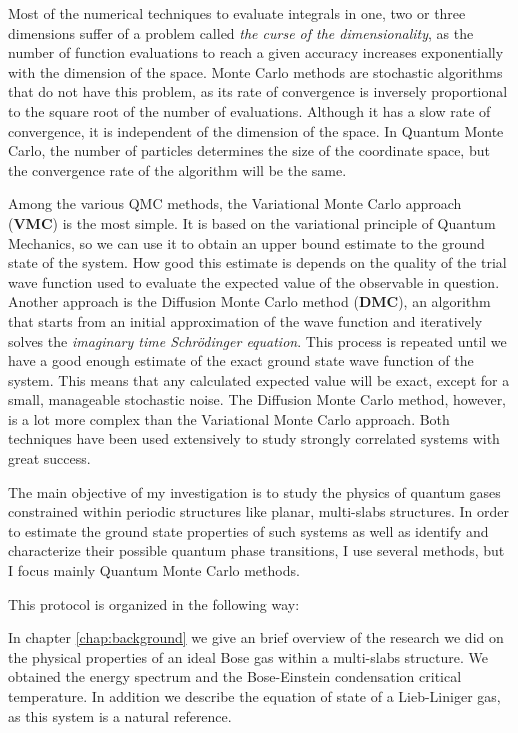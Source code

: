 Most of the numerical techniques to evaluate integrals in one, two or three
dimensions suffer of a problem called \textit{the curse of the dimensionality},
as the number of function evaluations to reach a given accuracy increases
exponentially with the dimension of the space. Monte Carlo methods are
stochastic algorithms that do not have this problem, as its rate of convergence
is inversely proportional to the square root of the number of evaluations.
Although it has a slow rate of convergence, it is independent of the dimension
of the space. In Quantum Monte Carlo, the number of particles determines the
size of the coordinate space, but the convergence rate of the algorithm will be
the same.

Among the various QMC methods, the Variational Monte Carlo approach
({\textbf{VMC}}) is the most simple. It is based on the variational principle of
Quantum Mechanics, so we can use it to obtain an upper bound estimate to the
ground state of the system. How good this estimate is depends on the quality of
the trial wave function used to evaluate the expected value of the observable in
question. Another approach is the Diffusion Monte Carlo method (\textbf{DMC}),
an algorithm that starts from an initial approximation of the wave function and
iteratively solves the \textit{imaginary time Schrödinger equation}. This
process is repeated until we have a good enough estimate of the exact ground
state wave function of the system. This means that any calculated expected value
will be exact, except for a small, manageable stochastic noise. The Diffusion
Monte Carlo method, however, is a lot more complex than the Variational Monte
Carlo approach. Both techniques have been used extensively to study strongly
correlated systems
\cite{bib:boronat-phys-rev-B.49.8920.1994,bib:casurellas-phys-rev-B.52.3654.1995,
  bib:astrakharchik-phys-rev-a.68.031602.2003,
  bib:astrakharchik-phys.rev.lett.95.190407.2005} with great success.

The main objective of my investigation is to study the physics of quantum gases
constrained within periodic structures like planar, multi-slabs structures. In
order to estimate the ground state properties of such systems as well as
identify and characterize their possible quantum phase transitions, I use
several methods, but I focus mainly Quantum Monte Carlo methods.

This protocol is organized in the following way:

In chapter \ref{chap:background} we give an brief overview of the research we
did on the physical properties of an ideal Bose gas within a multi-slabs
structure. We obtained the energy spectrum and the Bose-Einstein condensation
critical temperature.
In addition we describe the equation of state of a Lieb-Liniger gas, as this
system is a natural reference.

